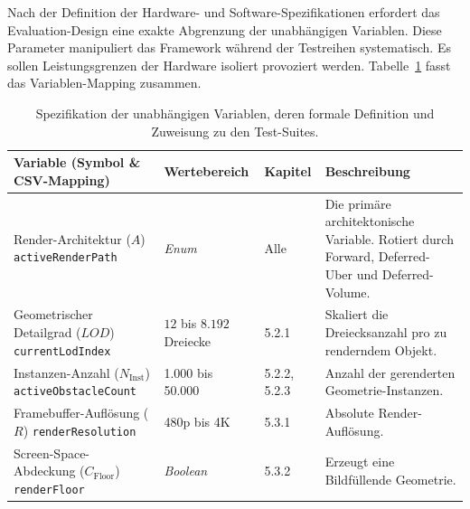 Nach der Definition der Hardware- und Software-Spezifikationen erfordert das Evaluation-Design eine exakte Abgrenzung
der unabhängigen Variablen.
Diese Parameter manipuliert das Framework während der Testreihen systematisch.
Es sollen Leistungsgrenzen der Hardware isoliert provoziert werden.
Tabelle~\ref{tab:independent_vars} fasst das Variablen-Mapping zusammen.

\begin{table}[htbp]
    \centering
    \caption{Spezifikation der unabhängigen Variablen, deren formale Definition und Zuweisung zu den Test-Suites.}
    \label{tab:independent_vars}
    \small
    \renewcommand{\arraystretch}{1.3}
    \begin{tabularx}{\textwidth}{@{} >{\raggedright\arraybackslash}p{4.2cm} l l >{\raggedright\arraybackslash}X @{}}
        \toprule
        \textbf{Variable (Symbol \& CSV-Mapping)}
        & \textbf{Wertebereich}
        & \textbf{Kapitel}
        & \textbf{Beschreibung} \\
        \midrule

        Render-Architektur ($A$) \newline \scriptsize{\texttt{activeRenderPath}}
        & \textit{Enum} & Alle
        & Die primäre architektonische Variable.
        Rotiert durch Forward, Deferred-Uber und Deferred-Volume. \\

        Geometrischer Detailgrad ($LOD$) \newline \scriptsize{\texttt{currentLodIndex}} &
        $12$ bis $8.192$ Dreiecke
        & 5.2.1
        & Skaliert die Dreiecksanzahl pro zu renderndem Objekt. \\

        Instanzen-Anzahl ($N_{\text{Inst}}$) \newline \scriptsize{\texttt{activeObstacleCount}}
        & 1.000 bis 50.000
        & 5.2.2, 5.2.3 &
        Anzahl der gerenderten Geometrie-Instanzen. \\

        Framebuffer-Auflösung ($R$) \newline \scriptsize{\texttt{renderResolution}}
        & 480p bis 4K
        & 5.3.1
        & Absolute Render-Auflösung. \\

        Screen-Space-Abdeckung ($C_{\text{Floor}}$) \newline \scriptsize{\texttt{renderFloor}}
        & \textit{Boolean}
        & 5.3.2
        & Erzeugt eine Bildfüllende Geometrie. \\


\end{tabularx}
\end{table}
